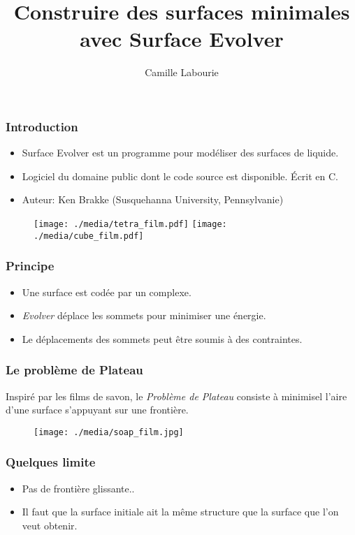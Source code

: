 \documentclass{beamer}
\title{Construire des surfaces minimales avec Surface Evolver}
\author{Camille Labourie}
\date{}
\begin{document}
\frame{\titlepage}

\begin{frame}
\frametitle{Introduction}
	\begin{itemize}
		\item Surface Evolver est un programme pour modéliser des surfaces de liquide.
		\item Logiciel du domaine public dont le code source est disponible. Écrit en C.
		\item Auteur: Ken Brakke (Susquehanna University, Pennsylvanie)
	\end{itemize}
\begin{figure}[h]
\begin{center}
\texttt{[image: ./media/tetra\_film.pdf]}
\qquad \qquad
\texttt{[image: ./media/cube\_film.pdf]}
\end{center}
\end{figure}
\end{frame}

\begin{frame}
\frametitle{Principe}
\begin{itemize}
	\item Une surface est codée par un complexe.
	\item \textit{Evolver} déplace les sommets pour minimiser une énergie. 
	\item Le déplacements des sommets peut être soumis à des contraintes.
\end{itemize}
\end{frame}

\begin{frame}
\frametitle{Le problème de Plateau}
Inspiré par les films de savon, le \emph{Problème de Plateau} consiste à minimisel l'aire d'une surface s'appuyant sur une frontière.
\begin{figure}[h]
\begin{center}
\texttt{[image: ./media/soap\_film.jpg]}
\end{center}
\end{figure}
\end{frame}

\begin{frame}
\frametitle{Quelques limite}
	\begin{itemize}
		\item Pas de frontière glissante..
		\item Il faut que la surface initiale ait la même structure que la surface que l'on veut obtenir.
	\end{itemize}
\end{frame}
\end{document}
